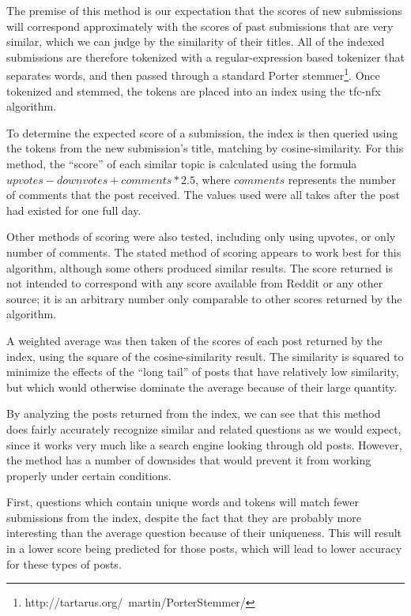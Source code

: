 \documentclass{acm_proc_article-sp}
\begin{document}
The premise of this method is our expectation that the scores of new submissions will correspond approximately
with the scores of past submissions that are very similar, which we can judge by the similarity of their titles.
All of the indexed submissions are therefore tokenized with a regular-expression based tokenizer that
separates words, and then passed through a standard Porter stemmer\footnote{http://tartarus.org/~martin/PorterStemmer/}.
Once tokenized and stemmed, the tokens are placed into an index using the tfc-nfx\cite{salton} algorithm.

To determine the expected score of a submission, the index is then queried using the tokens from the new submission's
title, matching by cosine-similarity.  For this method, the ``score'' of each similar topic is calculated using the formula
$upvotes - downvotes + comments*2.5$, where $comments$ represents the number of comments that the post received.  The values
used were all takes after the post had existed for one full day.

Other methods of scoring were also tested, including only using upvotes, or only number of comments.  The stated method of
scoring appears to work best for this algorithm, although some others produced similar results.  The score returned is not
intended to correspond with any score available from Reddit or any other source; it is an arbitrary number only comparable to
other scores returned by the algorithm.

A weighted average was then taken of the scores of each post returned by the index, using the square of the cosine-similarity
result.  The similarity is squared to minimize the effects of the ``long tail'' of posts that have relatively low similarity, but which
would otherwise dominate the average because of their large quantity.

By analyzing the posts returned from the index, we can see that this method does fairly accurately recognize similar
and related questions as we would expect, since it works very much like a search engine looking through old posts.  However, the
method has a number of downsides that would prevent it from working properly under certain conditions.

First, questions which contain unique words and tokens will match fewer submissions from the index, despite the fact that they are probably more
interesting than the average question because of their uniqueness.  This will result in a lower score being predicted for those
posts, which will lead to lower accuracy for these types of posts.
\end{document}
